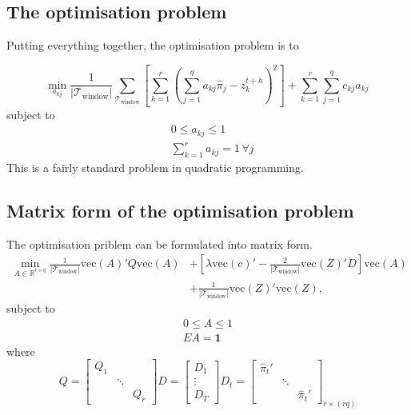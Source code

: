 \documentclass[a4paper,review,12pt,authoryear]{elsarticle}
\begin{document}
    \subsection{The optimisation problem}
    
    Putting everything together, the optimisation problem is to 
    
    \[
    \underset{a_{kj}}{\min} \frac{1}{|\mathcal{T}_{\textrm{window}}|}\sum\limits_{\mathcal{T}_{\textrm{window}}}\left[\sum\limits_{k=1}^r\left(\sum\limits_{j=1}^q a_{kj}\hat{{\pi}}_j-z^{t+h}_k\right)^2\right] + \sum\limits_{k=1}^r\sum\limits_{j=1}^q c_{kj}a_{kj}\,
    \]
    subject to
    \begin{align*}
    &0\leq a_{kj}\leq 1\\
    &\sum\limits_{k=1}^r a_{kj} = 1 \,\forall j
    \end{align*}
    This is a fairly standard problem in quadratic programming.

    \subsection{Matrix form of the optimisation problem}

    The optimisation priblem can be formulated into matrix form.
    \begin{align*}
      \min\limits_{A \in \mathbb{R}^{r\times q}} \frac{1}{|\mathcal{T}_{\textrm{window}}|}\text{vec}(A)' Q \text{vec}(A) &+ \left[\lambda \text{vec}(c)' - \frac{2}{|\mathcal{T}_{\textrm{window}}|}\text{vec}(Z)'D\right]\text{vec}(A) \\&+ \frac{1}{|\mathcal{T}_{\textrm{window}}|} \text{vec}(Z)'\text{vec}(Z),
    \end{align*}
    subject to \begin{align*}
      0 \leq A \leq 1\\
      E A = \mathbf{1}
    \end{align*}
    where
    \[
    Q = \left[\begin{matrix}
      Q_1  & \\
       &\ddots \\
       &  & Q_r

    \end{matrix}  \right]
    D = \left[\begin{matrix}
      D_1 \\ \vdots \\ D_T
    \end{matrix}\right] 
    D_t = \left[\begin{matrix}
      \hat\pi_{t}' & \\
      & \ddots & \\
      & & \hat\pi_{t}'
    \end{matrix}\right]_{r\times (rq)}
    \]
\end{document}
